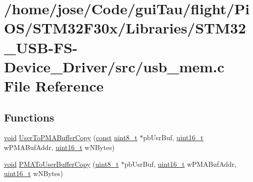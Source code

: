 \hypertarget{_s_t_m32_f30x_2_libraries_2_s_t_m32___u_s_b-_f_s-_device___driver_2src_2usb__mem_8c}{\section{/home/jose/\-Code/gui\-Tau/flight/\-Pi\-O\-S/\-S\-T\-M32\-F30x/\-Libraries/\-S\-T\-M32\-\_\-\-U\-S\-B-\/\-F\-S-\/\-Device\-\_\-\-Driver/src/usb\-\_\-mem.c File Reference}
\label{_s_t_m32_f30x_2_libraries_2_s_t_m32___u_s_b-_f_s-_device___driver_2src_2usb__mem_8c}
}
\subsection*{Functions}
\begin{DoxyCompactItemize}
\item 
\hyperlink{group___n_a_m_e_ga18028b8badbf1ea7e704ccac3c488e82}{void} \hyperlink{_s_t_m32_f30x_2_libraries_2_s_t_m32___u_s_b-_f_s-_device___driver_2src_2usb__mem_8c_a7e80055e83c3a7bf6229e0ff48c8bbc5}{User\-To\-P\-M\-A\-Buffer\-Copy} (\hyperlink{group___n_a_m_e_ga7ae6d0e43244213b34de2c2b9aa30da6}{const} \hyperlink{stdint_8h_aba7bc1797add20fe3efdf37ced1182c5}{uint8\-\_\-t} $\ast$pb\-Usr\-Buf, \hyperlink{stdint_8h_a273cf69d639a59973b6019625df33e30}{uint16\-\_\-t} w\-P\-M\-A\-Buf\-Addr, \hyperlink{stdint_8h_a273cf69d639a59973b6019625df33e30}{uint16\-\_\-t} w\-N\-Bytes)
\item 
\hyperlink{group___n_a_m_e_ga18028b8badbf1ea7e704ccac3c488e82}{void} \hyperlink{_s_t_m32_f30x_2_libraries_2_s_t_m32___u_s_b-_f_s-_device___driver_2src_2usb__mem_8c_ab6dd9414600ffbf779acfc5266f59353}{P\-M\-A\-To\-User\-Buffer\-Copy} (\hyperlink{stdint_8h_aba7bc1797add20fe3efdf37ced1182c5}{uint8\-\_\-t} $\ast$pb\-Usr\-Buf, \hyperlink{stdint_8h_a273cf69d639a59973b6019625df33e30}{uint16\-\_\-t} w\-P\-M\-A\-Buf\-Addr, \hyperlink{stdint_8h_a273cf69d639a59973b6019625df33e30}{uint16\-\_\-t} w\-N\-Bytes)
\end{DoxyCompactItemize}


